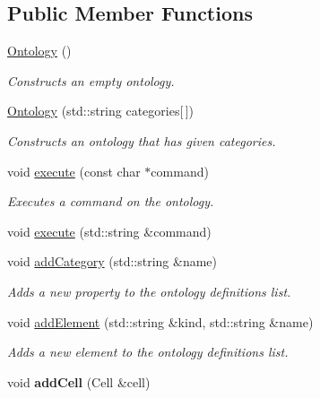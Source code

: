 \subsection*{\-Public \-Member \-Functions}
\begin{DoxyCompactItemize}
\item 
\hypertarget{class_ontology_a7c32cc412fe76fd5b148f52dd4bc0646}{\hyperlink{class_ontology_a7c32cc412fe76fd5b148f52dd4bc0646}{\-Ontology} ()}\label{class_ontology_a7c32cc412fe76fd5b148f52dd4bc0646}

\begin{DoxyCompactList}\small\item\em \-Constructs an empty ontology. \end{DoxyCompactList}\item 
\hyperlink{class_ontology_a2b0309345b55df1face155193731d66d}{\-Ontology} (std\-::string categories\mbox{[}$\,$\mbox{]})
\begin{DoxyCompactList}\small\item\em \-Constructs an ontology that has given categories. \end{DoxyCompactList}\item 
void \hyperlink{class_ontology_a66bce91133f0a4358e86440e96c473a9}{execute} (const char $\ast$command)
\begin{DoxyCompactList}\small\item\em \-Executes a command on the ontology. \end{DoxyCompactList}\item 
void \hyperlink{class_ontology_a19fc00fa444aa17e11e7df987fe1e4ef}{execute} (std\-::string \&command)
\item 
void \hyperlink{class_ontology_ac5a01673e1cf9e5630370a8c601a2d45}{add\-Category} (std\-::string \&name)
\begin{DoxyCompactList}\small\item\em \-Adds a new property to the ontology definitions list. \end{DoxyCompactList}\item 
void \hyperlink{class_ontology_a2eb5644b824de580d5d888822082ec21}{add\-Element} (std\-::string \&kind, std\-::string \&name)
\begin{DoxyCompactList}\small\item\em \-Adds a new element to the ontology definitions list. \end{DoxyCompactList}\item 
\hypertarget{class_ontology_a323ef74eee40d73b0258f83fd7931e77}{void {\bfseries add\-Cell} (\-Cell \&cell)}\label{class_ontology_a323ef74eee40d73b0258f83fd7931e77}


\end{DoxyCompactItemize}
